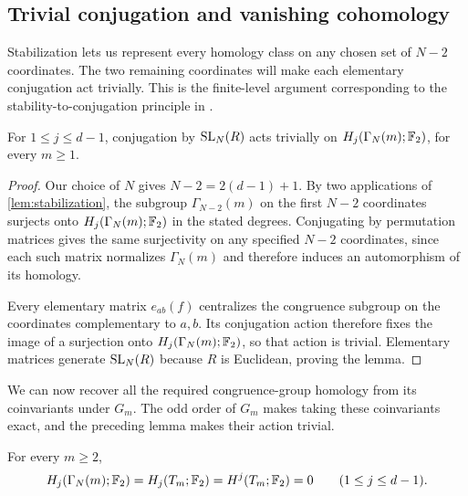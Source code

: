 \subsection{Trivial conjugation and vanishing cohomology}
\label{subsec:conjugation}

Stabilization lets us represent every homology class on any chosen set
of $N-2$ coordinates. The two remaining coordinates will make each
elementary conjugation act trivially. This is the finite-level argument
corresponding to the stability-to-conjugation principle in
\cite[Corollary~5.14]{Iwasa}.

\begin{lemma}\label{lem:trivial-action}
For $1\le j\le d-1$, conjugation by $\operatorname{SL}_N(R)$ acts trivially on
$H_j(\Gamma_N(m);\mathbb F_2)$, for every $m\ge1$.
\end{lemma}

\begin{proof}
Our choice of $N$ gives $N-2=2(d-1)+1$. By two applications of
\cref{lem:stabilization}, the subgroup $\Gamma_{N-2}(m)$ on the first
$N-2$ coordinates surjects onto $H_j(\Gamma_N(m);\mathbb F_2)$ in the stated
degrees. Conjugating by permutation matrices gives the same surjectivity
on any specified $N-2$ coordinates, since each such matrix normalizes
$\Gamma_N(m)$ and therefore induces an automorphism of its homology.

Every elementary matrix $e_{ab}(f)$ centralizes the congruence subgroup
on the coordinates complementary to $a,b$. Its conjugation action
therefore fixes the image of a surjection onto $H_j(\Gamma_N(m);\mathbb F_2)$,
so that action is trivial. Elementary matrices generate $\operatorname{SL}_N(R)$
because $R$ is Euclidean, proving the lemma.
\end{proof}

We can now recover all the required congruence-group homology from its
coinvariants under $G_m$. The odd order of $G_m$ makes taking these
coinvariants exact, and the preceding lemma makes their action trivial.

\begin{proposition}\label{prop:quotient-homology}
For every $m\ge2$,
\[
 H_j(\Gamma_N(m);\mathbb F_2)=H_j(T_m;\mathbb F_2)=H^j(T_m;\mathbb F_2)=0
 \qquad(1\le j\le d-1).
\]
\end{proposition}

